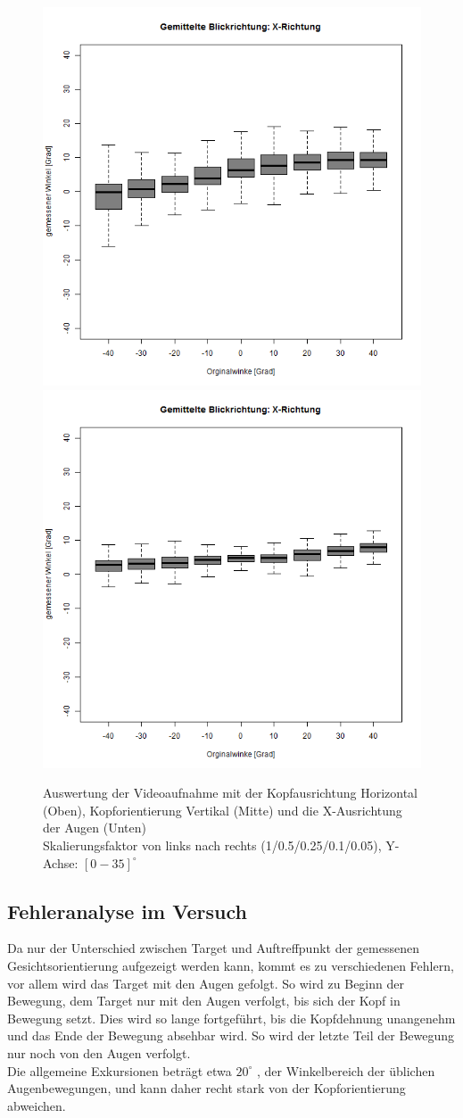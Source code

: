 \begin{landscape}
\begin{figure}
	\includegraphics[width=0.192\linewidth]{OpenFace_Img/EyeAVG_x_S01}
	\includegraphics[width=0.192\linewidth]{OpenFace_Img/EyeAVG_x_S005}
	\caption{Auswertung der Videoaufnahme mit der Kopfausrichtung Horizontal (Oben), Kopforientierung Vertikal (Mitte) und die X-Ausrichtung der Augen (Unten)\\Skalierungsfaktor von links nach rechts (1/0.5/0.25/0.1/0.05), Y-Achse: $[0-35]^\circ$}
	\label{graph_VideoSkalierung}
\end{figure}
\end{landscape}
\subsection{Fehleranalyse im Versuch}
Da nur der Unterschied zwischen Target und Auftreffpunkt der gemessenen Gesichtsorientierung aufgezeigt werden kann, kommt es zu verschiedenen Fehlern, vor allem wird das Target mit den Augen gefolgt.
So wird zu Beginn der Bewegung, dem Target nur mit den Augen verfolgt, bis sich der Kopf in Bewegung setzt. Dies wird so lange fortgeführt, bis die Kopfdehnung unangenehm und das Ende der Bewegung absehbar wird. So wird der letzte Teil der Bewegung nur noch von den Augen verfolgt.\\
Die allgemeine Exkursionen beträgt etwa $20^\circ$ \cite{wiki_Gesichtsfeld}, der Winkelbereich der üblichen Augenbewegungen, und kann daher recht stark von der Kopforientierung abweichen.\\
